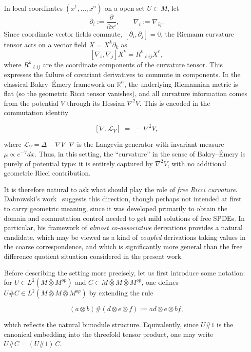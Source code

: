 \documentclass[10pt,a4paper,reqno]{amsart}
\begin{document}
In local coordinates $(x^1,\dots,x^n)$ on a open set $U\subset M$, let
\[
\partial_i := \frac{\partial}{\partial x^i}, \qquad \nabla_i := \nabla_{\partial_i}.
\]
Since coordinate vector fields commute, $[\partial_i,\partial_j] = 0$, the Riemann curvature tensor acts on a vector field $X = X^k \partial_k$ as
\[
[\nabla_i, \nabla_j] X^k = R^k{}_{\ell ij} X^\ell,
\]
where $R^k{}_{\ell ij}$ are the coordinate components of the curvature tensor.
This expresses the failure of covariant derivatives to commute in components.
 In the classical Bakry--Émery framework on $\mathbb{R}^n$, the
underlying Riemannian metric is flat (so the geometric Ricci tensor vanishes),
and all curvature information comes from the potential $V$ through its Hessian
$\nabla^2 V$.  This is encoded in the commutation identity


\[
[\nabla,\mathcal{L}_V] \;=\; -\,\nabla^2 V,
\]


where $\mathcal{L}_V = \Delta - \nabla V\cdot\nabla$ is the Langevin generator
with invariant measure $\mu\propto e^{-V}dx$.  Thus, in this setting, the
``curvature'' in the sense of Bakry--Émery is purely of potential type: it is
entirely captured by $\nabla^2V$, with no additional geometric Ricci
contribution.

\smallskip

It is therefore natural to ask what should play the role of \emph{free Ricci
curvature}.  Dabrowski's work~\cite{Dab14v2} suggests this direction, though
perhaps not intended at first to carry geometric meaning, since it was developed
primarily to obtain the domain and commutation control needed to get mild
solutions of free SPDEs.  In particular, his framework of \emph{almost
co-associative} derivations \cite[Definition~20]{Dab14v2} provides a natural
candidate, which may be viewed as a kind of \emph{coupled} derivations taking
values in the coarse correspondence, and which is significantly more general
than the free difference quotient situation considered in the present work.

\bigbreak

Before describing the setting more precisely, let us first introduce some
notation: for $U\in L^2(M\bar \otimes M^{op})$ and
$C\in M\bar\otimes M\bar\otimes M^{op}$, one defines
$U\# C\in L^2(M\bar\otimes M\bar\otimes M^{op})$ by extending the rule


\[
(a\otimes b)\#(d\otimes e\otimes f)
  := ad\otimes e\otimes bf,
\]


which reflects the natural bimodule structure.  Equivalently, since $U\#1$ is
the canonical embedding into the threefold tensor product, one may write
$U\# C = (U\#1)\,C$.
\end{document}
